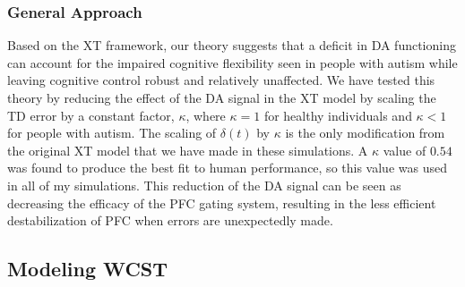 \subsubsection{General Approach}
Based on the XT framework, our theory suggests that a deficit in DA functioning can account for the impaired cognitive flexibility seen in people with autism while leaving cognitive control robust and relatively unaffected.  We have tested this theory by reducing the effect of the DA signal in the XT model by scaling the TD error by a constant factor, $\kappa$, where $\kappa = 1$ for healthy individuals and $\kappa < 1$ for people with autism.  The scaling of $\delta(t)$ by $\kappa$ is the only modification from the original XT model that we have made in these simulations.  A $\kappa$ value of $0.54$ was found to produce the best fit to human performance, so this value was used in all of my simulations.  This reduction of the DA signal can be seen as decreasing the efficacy of the PFC gating system, resulting in the less efficient destabilization of PFC when errors are unexpectedly made. %


\subsection{Modeling WCST} 

